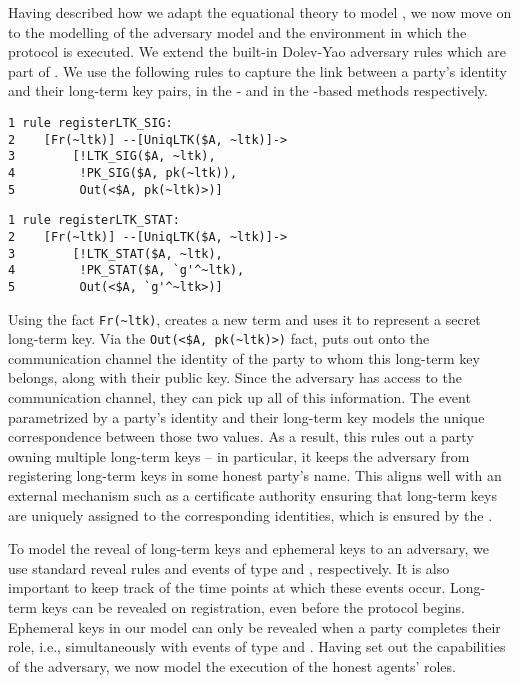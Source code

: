 Having described how we adapt the equational theory to model \mEdhoc,
we now move on to the modelling of the adversary model and the 
environment in
which the protocol is executed.
%
We extend the built-in Dolev-Yao adversary rules which are part of 
\mTamarin.
%
We use the following rules to capture the link between a party's identity and
their long-term key pairs, in the \mSig{}- and in the \mStat{}-based methods
respectively.
\begin{center}
\begin{minipage}{0.48\textwidth}
\begin{scriptsize}
\begin{verbatim}
1 rule registerLTK_SIG:
2    [Fr(~ltk)] --[UniqLTK($A, ~ltk)]->
3        [!LTK_SIG($A, ~ltk),
4         !PK_SIG($A, pk(~ltk)),
5         Out(<$A, pk(~ltk)>)]
\end{verbatim}
\end{scriptsize}
\end{minipage}
\hfill\vline\hfill
\begin{minipage}{0.48\textwidth}
\begin{scriptsize}
\begin{verbatim}
1 rule registerLTK_STAT:
2    [Fr(~ltk)] --[UniqLTK($A, ~ltk)]->
3        [!LTK_STAT($A, ~ltk),
4         !PK_STAT($A, `g'^~ltk),
5         Out(<$A, `g'^~ltk>)]
\end{verbatim}
\end{scriptsize}
\end{minipage}
\end{center}

Using the fact \verb|Fr(~ltk)|, \mTamarin{} creates a new term  and 
uses
it to represent a secret long-term key.
%
Via the \verb|Out(<$A, pk(~ltk)>)| fact, \mTamarin{} puts out onto the
communication channel the identity of the party to whom this long-term
key belongs, along with their public key.
%
Since the adversary has access to the communication channel, they can pick 
up
all of this information.
%
The event  parametrized by a party's identity and their 
long-term
key 
models the unique correspondence between those two values.
%
As a result, this rules out a party owning multiple long-term keys
-- in particular, it keeps the adversary from registering long-term keys in
some honest party's name.
%
This aligns well with an external mechanism such as a certificate authority
ensuring that long-term keys are uniquely assigned to the corresponding
identities, which is ensured by the \mSpec.

To model the reveal of long-term keys and ephemeral keys to an adversary,
we use standard reveal rules and events of type \mRevLTK{} and \mRevEph,
respectively.
%
It is also important to keep track of the time points at which these events 
occur.
%
Long-term keys can be revealed on registration, even before the protocol 
begins.
%
Ephemeral keys in our model can only be revealed when a party
completes their role, i.e., simultaneously with events of type \mIComplete{}
and \mRComplete.
%
Having set out the capabilities of the adversary, we now model the execution
of the honest agents' roles.
%

